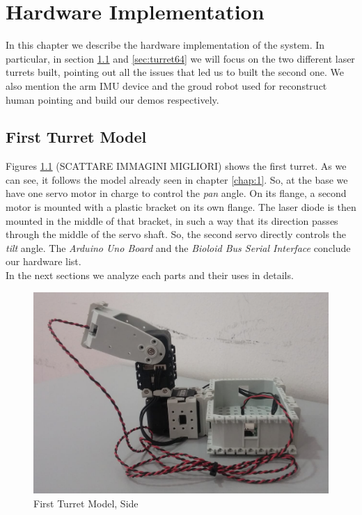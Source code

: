 \chapter{Hardware Implementation}
\label{chap:2}
In this chapter we describe the hardware implementation of the system. In particular, in section \ref{sec:turret12} and \ref{sec:turret64} we will focus on the two different laser turrets built, pointing out all the issues that led us to built the second one. We also mention the arm IMU device and the groud robot used for reconstruct human pointing and build our demos respectively.
\section{First Turret Model} \label{sec:turret12}
Figures \ref{fig:firstModelSide} (SCATTARE IMMAGINI MIGLIORI) shows the first turret. As we can see, it follows the model already seen in chapter \ref{chap:1}. So, at the base we have one servo motor in charge to control the \emph{pan} angle. On its flange, a second motor is mounted with a plastic bracket on its own flange. The laser diode is then mounted in the middle of that bracket, in such a way that its direction passes through the middle of the servo shaft. So, the second servo directly controls the \emph{tilt} angle. 
The \emph{Arduino Uno Board} and the \emph{Bioloid Bus Serial Interface} conclude our hardware list.
\\In the next sections we analyze each parts and their uses in details.
\begin{figure}
	\centering
	\includegraphics[width=\textwidth]{img/firstModelSide.png}%
	\caption{First Turret Model, Side}
	\label{fig:firstModelSide}
\end{figure}
